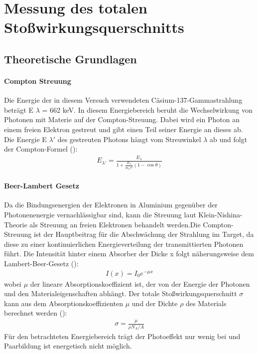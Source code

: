 \section{Messung des totalen Stoßwirkungsquerschnitts}
\subsection{Theoretische Grundlagen}
\paragraph{Compton Streuung}
Die Energie der in diesem Versuch verwendeten Cäsium-137-Gammastrahlung beträgt E
$\lambda$ = 662 keV. In diesem Energiebereich beruht die Wechselwirkung von Photonen mit Materie auf der Compton-Streuung. Dabei wird ein Photon an einem freien Elektron gestreut und gibt einen Teil seiner Energie an dieses ab. Die Energie E
$\lambda'$ des gestreuten Photons hängt vom Streuwinkel $\lambda$ ab und folgt der Compton-Formel (\cite{Wermes}):
\begin{align*}
    E_{\lambda'} = \frac{E_{\lambda}}{1 + \frac{E_{\lambda}}{m_e c^2} (1 - \cos \theta)}
\end{align*}
\label{form:compton}
\paragraph{Beer-Lambert Gesetz}
Da die Bindungsenergien der Elektronen in Aluminium gegenüber der Photonenenergie vernachlässigbar sind, kann die Streuung laut Klein-Nishina-Theorie als Streuung an freien Elektronen behandelt werden.Die Compton-Streuung ist der Hauptbeitrag für die Abschwächung der Strahlung im Target, da diese zu einer kontinuierlichen Energieverteilung der transmittierten Photonen führt. Die Intensität hinter einem Absorber der Dicke x folgt näherungsweise dem Lambert-Beer-Gesetz (\cite{}):
\begin{align*}
    I(x) = I_0 e^{-\mu x}
\end{align*}
\label{form:beer-lambert}
wobei $\mu$ der lineare Absorptionskoeffizient ist, der von der Energie der Photonen und den Materialeigenschaften abhängt. Der totale Stoßwirkungsquerschnitt $\sigma$ kann aus dem Absorptionskoeffizienten $\mu$ und der Dichte $\rho$ des Materials berechnet werden (\cite{}):
\begin{align*}
    \sigma = \frac{\mu}{\rho N_A / A}
\end{align*}
Für den betrachteten Energiebereich trägt der Photoeffekt nur wenig bei und Paarbildung ist energetisch nicht möglich.
